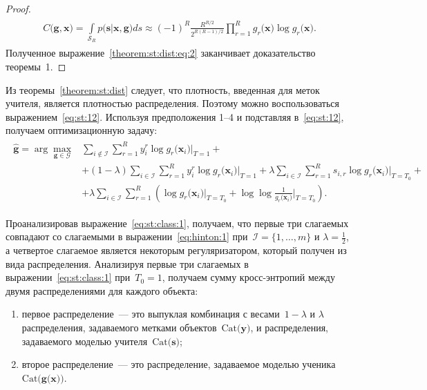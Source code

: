 \begin{proof}
	\begin{gather}
	\label{theorem:st:dist:eq:2}
	\begin{aligned}
		C\bigr(\mathbf{g}, \mathbf{x}\bigr) = \int\limits_{\mathcal{S}_R}p\bigr(\mathbf{s}|\mathbf{x}, \mathbf{g}\bigr)ds \approx \left(-1\right)^{R}\frac{R^{R/2}}{2^{R(R-1)/2}}\prod_{r=1}^{R}g_r\bigr(\mathbf{x}\bigr)\log g_r\bigr(\mathbf{x}\bigr).
	\end{aligned}
	\end{gather}
Полученное выражение~\eqref{theorem:st:dist:eq:2} заканчивает доказательство теоремы~1.
\end{proof}

Из теоремы~\ref{theorem:st:dist} следует, что плотность, введенная для меток учителя, является плотностью распределения. Поэтому можно воспользоваться выражением~\eqref{eq:st:12}.
Используя предположения 1--4 и подставляя в~\eqref{eq:st:12}, получаем  оптимизационную задачу:
\begin{gather}
\label{eq:st:class:1}
\begin{aligned}
\hat{\mathbf{g}} = \arg\max_{\mathbf{g}\in \mathcal{G}} & \sum_{i\not\in \mathcal{I}}\sum_{r=1}^{R}y_i^r\log g_r\bigr(\mathbf{x}_i\bigr)\bigr|_{T=1} +\\
&+ \left(1-\lambda\right)\sum_{i\in \mathcal{I}}\sum_{r=1}^{R}y_i^r\log g_r\bigr(\mathbf{x}_i\bigr)\bigr|_{T=1} + \lambda\sum_{i\in \mathcal{I}}\sum_{r=1}^{R}s_{i,r}\log g_r\bigr(\mathbf{x}_i\bigr)\bigr|_{T=T_0} +\\
&+ \lambda \sum_{i\in \mathcal{I}}\sum_{r=1}^{R}\left(\log g_r\bigr(\mathbf{x}_i\bigr)\bigr|_{T=T_0} + \log\log\frac{1}{g_r\bigr(\mathbf{x}_i\bigr)}\bigr|_{T=T_0}\right).
\end{aligned}
\end{gather}

Проанализировав выражение~\eqref{eq:st:class:1}, получаем, что первые три слагаемых совпадают со слагаемыми в выражении~\eqref{eq:hinton:1} при~$\mathcal{I} = \{1, \ldots, m\}$ и $\lambda=\frac{1}{2}$, а четвертое слагаемое является некоторым регуляризатором, который получен из вида распределения. Анализируя первые три слагаемых в выражении~\eqref{eq:st:class:1} при~$T_0 = 1$, получаем сумму кросс-энтропий между двумя распределениями для каждого объекта:
\begin{enumerate}[1)]
	\item первое распределение~--- это выпуклая комбинация с весами~$1-\lambda$ и $\lambda$ распределения, задаваемого метками объектов~$\text{Cat}\bigr(\mathbf{y}\bigr)$, и распределения, задаваемого моделью учителя~$\text{Cat}\bigr(\mathbf{s}\bigr)$;
	\item второе распределение~--- это распределение, задаваемое моделью ученика~$\text{Cat}\bigr(\mathbf{g}\bigr(\mathbf{x}\bigr)\bigr)$.
\end{enumerate}

